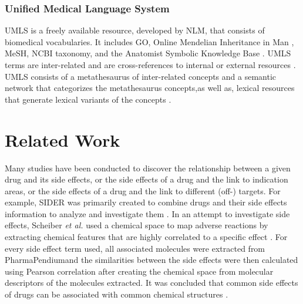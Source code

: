 \subsubsection{Unified Medical Language System}
\ac{UMLS} is a freely available resource, developed by \ac{NLM}, that consists of biomedical vocabularies. It includes \ac{GO}, Online Mendelian Inheritance in Man \cite{amberger_omim.org:_2015}, \ac{MeSH}, \ac{NCBI} taxonomy, and the Anatomist Symbolic Knowledge Base \cite{rosse_motivation_1998}. \ac{UMLS} terms are inter-related and are cross-references to internal or external resources \cite{bodenreider_unified_2004}. \ac{UMLS} consists of a metathesaurus of inter-related concepts and a semantic network that categorizes the metathesaurus concepts,as well as, lexical resources that generate lexical variants of the concepts \cite{bodenreider_unified_2004}.

\section{Related Work}
Many studies have been conducted to discover the relationship between a given drug and its side effects, or the side effects of a drug and the link to indication areas, or the side effects of a drug and the link to different (off-) targets. For example, \ac{SIDER} was primarily created to combine drugs and their side effects information to analyze and investigate them \cite{kuhn_side_2010}.
In an attempt to investigate side effects, Scheiber \textit{et al.} used a chemical space to map adverse reactions by extracting chemical features that are highly correlated to a specific effect \cite{scheiber_mapping_2009}. For every side effect term used, all associated molecules were extracted from PharmaPendium\footnotemark and the similarities between the side effects were then calculated using Pearson correlation after creating the chemical space from molecular descriptors of the molecules extracted. It was concluded that common side effects of drugs can be associated with common chemical structures \cite{scheiber_mapping_2009}. 

